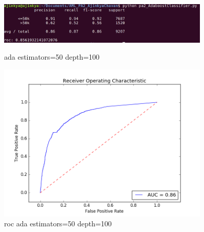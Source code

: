 \documentclass{article}
\begin{document}
\begin{figure}
    \centering
    \begin{minipage}{0.45\textwidth}
        \centering
        \includegraphics[width=0.9\textwidth]{ada_50_100.png} %
        \caption{ada estimators=50 depth=100}
    \end{minipage}\hfill
    \begin{minipage}{0.45\textwidth}
        \centering
        \includegraphics[width=0.9\textwidth]{roc_ada_50_100.png} %
        \caption{roc ada estimators=50 depth=100}
    \end{minipage}
\end{figure}
\end{document}
